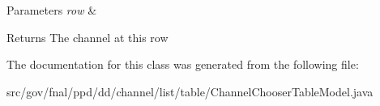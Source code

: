 \begin{DoxyParams}{Parameters}
{\em row} & \\
\hline
\end{DoxyParams}
\begin{DoxyReturn}{Returns}
The channel at this row 
\end{DoxyReturn}


The documentation for this class was generated from the following file\-:\begin{DoxyCompactItemize}
\item 
src/gov/fnal/ppd/dd/channel/list/table/Channel\-Chooser\-Table\-Model.\-java\end{DoxyCompactItemize}

